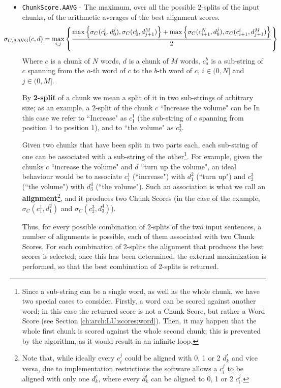 \begin{itemize}
	\item \texttt{ChunkScore.AAVG} - The maximum, over all the possible 2-splits of the input chunks, of the arithmetic averages of the best alignment scores.
	\begin{displaymath}
	\hspace{-1cm}	\sigma_{C,\text{AAVG}}(c,d) = \max\limits_{i,j}\left\{\frac{ \max\left\{\sigma_C(c_0^i,d_0^j), \sigma_C(c_0^i,d_{j+1}^M)\right\} + \max\left\{\sigma_C(c_{i+1}^N,d_0^j),\sigma_C(c_{i+1}^i,d_{j+1}^M)\right\}}{2}\right\}
	\end{displaymath}
	Where $c$ is a chunk of $N$ words, $d$ is a chunk of $M$ words, $c_a^b$ is a sub-string of $c$ spanning from the $a$-th word of $c$ to the $b$-th word of $c$, $i\in(0,N]$ and $j\in(0,M]$.
	
	By \textbf{2-split} of a chunk we mean a split of it in two sub-strings of arbitrary size; as an example, a 2-split of the chunk $c$ ``Increase the volume" can be  In this case we refer to ``Increase" as $c_1^1$ (the sub-string of $c$ spanning from position 1 to position 1), and to ``the volume" as $c_2^3$.
	
	Given two chunks that have been split in two parts each, each sub-string of one can be associated with a sub-string of the other\footnote{Since a sub-string can be a single word, as well as the whole chunk, we have two special cases to consider. Firstly, a word can be scored against another word; in this case the returned score is not a Chunk Score, but rather a Word Score (see Section \ref{ch:arch:LU:scores:word}). Then, it may happen that the whole first chunk is scored against the whole second chunk; this is prevented by the algorithm, as it would result in an infinite loop.}. For example, given the chunks $c$ ``increase the volume" and $d$ ``turn up the volume", an ideal behaviour would be to associate $c_1^1$ (``increase") with $d_1^2$ (``turn up") and $c_2^3$ (``the volume") with $d_3^4$ (``the volume"). Such an association is what we call an \textbf{alignment}\footnote{Note that, while ideally every $c_i^j$ could be aligned with 0, 1 or 2 $d_k^l$ and vice versa, due to implementation restrictions the software allows a $c_i^j$ to be aligned with only one $d_k^l$, where every $d_k^l$ can be aligned to 0, 1 or 2 $c_i^j$. }, and it produces two Chunk Scores (in the case of the example, $\sigma_C(c_1^1,d_1^2)$ and $\sigma_C(c_2^3,d_3^4)$).
	
	Thus, for every possible combination of 2-splits of the two input sentences, a number of alignments is possible, each of them associated with two Chunk Scores. For each combination of 2-splits the alignment that produces the best scores is selected; once this has been determined, the external maximization is performed, so that the best combination of 2-splits is returned.
	

\end{itemize}
